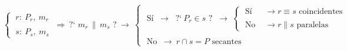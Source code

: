 \begin{theorem} 

$$\begin{cases} \ r:\ P_r,\ m_r \\ \\ \ s:\ P_s, \ m_s \end{cases} \ \Rightarrow \ 
\text{?` } m_r \, \parallel \, m_s \text{\ ?} \ \to \
\begin{cases}
	\text{ Sí } 
\ \to \ \text{ ?`} \ P_r \in s \text{ ? } \ \to \
		\begin{cases}
		\text{ Sí}     &\to r\equiv s \text{ coincidentes}
		\\ \\ \text{ No } &\to r\parallel s \text{ paralelas}
		\end{cases}	
\\ \\ \text{ No }\ \to \ r\cap s=P \text{ secantes}
\end{cases}$$
	
\end{theorem}

